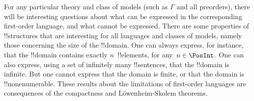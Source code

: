 \documentclass[../../../include/open-logic-section]{subfiles}
\begin{document}
For any particular theory and class of models (such as $\Gamma$ and
all preorders), there will be interesting questions about what can be
expressed in the corresponding first-order language, and what cannot
be expressed. There are some properties of !!{structure}s that are
interesting for all languages and classes of models, namely those
concerning the size of the !!{domain}.  One can always express, for
instance, that the !!{domain} contains exactly $n$~!!{element}s, for
any~$n \in \PosInt$.  One can also express, using a set of infinitely
many !!{sentence}s, that the !!{domain} is infinite.  But one cannot
express that the domain is finite, or that the domain is
!!{nonenumerable}. These results about the limitations of first-order
languages are consequences of the compactness and L\"owenheim-Skolem
theorems.
\end{document}
